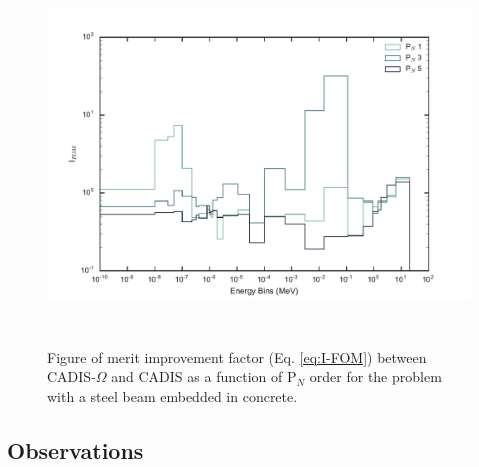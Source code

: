\begin{figure}[h!]
  \centering
  \includegraphics[height=10cm]{./chapters/characterization_probs/figures/angle/prob_1/compare_fom_pN.pdf}
  \caption[Figure of merit improvement factor (Eq. \eqref{eq:I-FOM}) between CADIS-$\Omega$ and
  CADIS as a function of P$_N$ order for steel beam embedded in concrete.]
  {Figure of merit improvement factor (Eq. \eqref{eq:I-FOM}) between CADIS-$\Omega$ and
   CADIS as a function of P$_N$ order for the problem with a
   steel beam embedded in concrete.}
  \label{fig:prob_1_pN_I_FOM}
\end{figure}

%
%
%
%
%
%
%

\subsection{Observations}
\label{subsec:observations}

